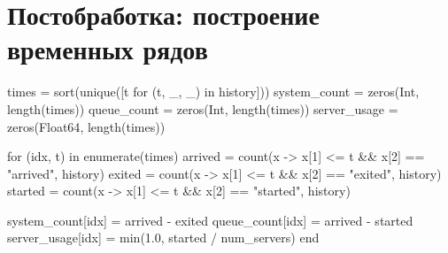 \documentclass[
  12pt,
  a4paper,
  DIV=11,
  numbers=noendperiod]{scrreprt}
\newenvironment{Shaded}{\begin{snugshade}}{\end{snugshade}}
\newcommand{\ControlFlowTok}[1]{\textcolor[rgb]{0.00,0.23,0.31}{#1}}
\newcommand{\DataTypeTok}[1]{\textcolor[rgb]{0.68,0.00,0.00}{#1}}
\newcommand{\FloatTok}[1]{\textcolor[rgb]{0.68,0.00,0.00}{#1}}
\newcommand{\FunctionTok}[1]{\textcolor[rgb]{0.28,0.35,0.67}{#1}}
\newcommand{\KeywordTok}[1]{\textcolor[rgb]{0.00,0.23,0.31}{#1}}
\newcommand{\NormalTok}[1]{\textcolor[rgb]{0.00,0.23,0.31}{#1}}
\newcommand{\OperatorTok}[1]{\textcolor[rgb]{0.37,0.37,0.37}{#1}}
\newcommand{\StringTok}[1]{\textcolor[rgb]{0.13,0.47,0.30}{#1}}
\begin{document}
\section{Постобработка: построение временных
рядов}\label{ux43fux43eux441ux442ux43eux431ux440ux430ux431ux43eux442ux43aux430-ux43fux43eux441ux442ux440ux43eux435ux43dux438ux435-ux432ux440ux435ux43cux435ux43dux43dux44bux445-ux440ux44fux434ux43eux432}

\begin{Shaded}
\begin{Highlighting}[]
\NormalTok{times }\OperatorTok{=} \FunctionTok{sort}\NormalTok{(}\FunctionTok{unique}\NormalTok{([t for (t, \_, \_) }\KeywordTok{in}\NormalTok{ history]))}
\NormalTok{system\_count }\OperatorTok{=} \FunctionTok{zeros}\NormalTok{(}\DataTypeTok{Int}\NormalTok{, }\FunctionTok{length}\NormalTok{(times))}
\NormalTok{queue\_count }\OperatorTok{=} \FunctionTok{zeros}\NormalTok{(}\DataTypeTok{Int}\NormalTok{, }\FunctionTok{length}\NormalTok{(times))}
\NormalTok{server\_usage }\OperatorTok{=} \FunctionTok{zeros}\NormalTok{(}\DataTypeTok{Float64}\NormalTok{, }\FunctionTok{length}\NormalTok{(times))}

\ControlFlowTok{for}\NormalTok{ (idx, t) }\KeywordTok{in} \FunctionTok{enumerate}\NormalTok{(times)}
\NormalTok{    arrived }\OperatorTok{=} \FunctionTok{count}\NormalTok{(x }\OperatorTok{{-}\textgreater{}}\NormalTok{ x[}\FloatTok{1}\NormalTok{] }\OperatorTok{\textless{}=}\NormalTok{ t }\OperatorTok{\&\&}\NormalTok{ x[}\FloatTok{2}\NormalTok{] }\OperatorTok{==} \StringTok{"arrived"}\NormalTok{, history)}
\NormalTok{    exited }\OperatorTok{=} \FunctionTok{count}\NormalTok{(x }\OperatorTok{{-}\textgreater{}}\NormalTok{ x[}\FloatTok{1}\NormalTok{] }\OperatorTok{\textless{}=}\NormalTok{ t }\OperatorTok{\&\&}\NormalTok{ x[}\FloatTok{2}\NormalTok{] }\OperatorTok{==} \StringTok{"exited"}\NormalTok{, history)}
\NormalTok{    started }\OperatorTok{=} \FunctionTok{count}\NormalTok{(x }\OperatorTok{{-}\textgreater{}}\NormalTok{ x[}\FloatTok{1}\NormalTok{] }\OperatorTok{\textless{}=}\NormalTok{ t }\OperatorTok{\&\&}\NormalTok{ x[}\FloatTok{2}\NormalTok{] }\OperatorTok{==} \StringTok{"started"}\NormalTok{, history)}

\NormalTok{    system\_count[idx] }\OperatorTok{=}\NormalTok{ arrived }\OperatorTok{{-}}\NormalTok{ exited}
\NormalTok{    queue\_count[idx] }\OperatorTok{=}\NormalTok{ arrived }\OperatorTok{{-}}\NormalTok{ started}
\NormalTok{    server\_usage[idx] }\OperatorTok{=} \FunctionTok{min}\NormalTok{(}\FloatTok{1.0}\NormalTok{, started }\OperatorTok{/}\NormalTok{ num\_servers)}
\ControlFlowTok{end}
\end{Highlighting}
\end{Shaded}
\end{document}
